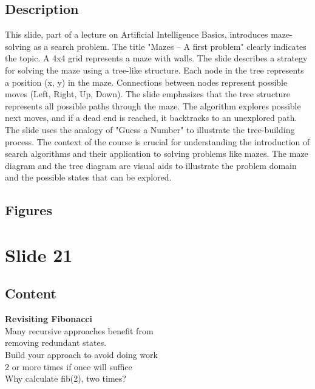 \documentclass{article}%
\begin{document}
\subsection{Description}%
This slide, part of a lecture on Artificial Intelligence Basics, introduces maze-solving as a search problem.  The title "Mazes – A first problem" clearly indicates the topic.  A 4x4 grid represents a maze with walls.  The slide describes a strategy for solving the maze using a tree-like structure.  Each node in the tree represents a position (x, y) in the maze.  Connections between nodes represent possible moves (Left, Right, Up, Down).  The slide emphasizes that the tree structure represents all possible paths through the maze.  The algorithm explores possible next moves, and if a dead end is reached, it backtracks to an unexplored path.  The slide uses the analogy of "Guess a Number" to illustrate the tree-building process.  The context of the course is crucial for understanding the introduction of search algorithms and their application to solving problems like mazes. The maze diagram and the tree diagram are visual aids to illustrate the problem domain and the possible states that can be explored.%
\subsection{Figures}%
\begin{figure}[H]%
\centering%
\end{figure}

%
\newpage%
\section{Slide 21}%
\label{sec:Slide21}%
\subsection{Content}%

\textbf{Revisiting Fibonacci} \\
Many recursive approaches benefit from \\
removing redundant states. \\
Build your approach to avoid doing work \\
2 or more times if once will suffice \\
Why calculate fib(2), two times? \\
%
\end{document}

